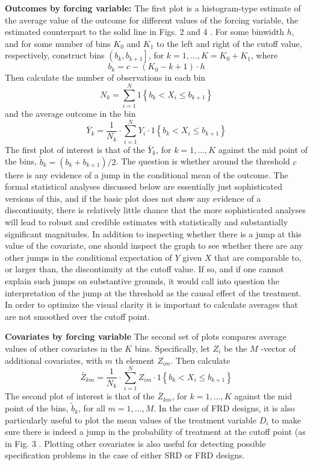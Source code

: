 \documentclass[11pt]{book}%
\begin{document}
\textbf{Outcomes by forcing variable:} 
The first plot is a histogram-type estimate of the average value of the outcome for different values of the forcing variable, the estimated counterpart to the solid line in Figs. 2 and 4 . For some binwidth $h$, and for some number of bins $K_{0}$ and $K_{1}$ to the left and right of the cutoff value, respectively, construct bins $\left(b_{k}, b_{k+1}\right]$, for $k=1, \ldots, K=K_{0}+K_{1}$, where
$$
b_{k}=c-\left(K_{0}-k+1\right) \cdot h
$$
Then calculate the number of observations in each bin
$$
N_{k}=\sum_{i=1}^{N} 1\left\{b_{k}<X_{i} \leqslant b_{k+1}\right\}
$$
and the average outcome in the bin
$$
\bar{Y}_{k}=\frac{1}{N_{k}} \cdot \sum_{i=1}^{N} Y_{i} \cdot 1\left\{b_{k}<X_{i} \leqslant b_{k+1}\right\}
$$
The first plot of interest is that of the $\bar{Y}_{k}$, for $k=1, \ldots, K$ against the mid point of the bins, $\tilde{b}_{k}=\left(b_{k}+b_{k+1}\right) / 2$. The question is whether around the threshold $c$ there is any evidence of a jump in the conditional mean of the outcome. The formal statistical analyses discussed below are essentially just sophisticated versions of this, and if the basic plot does not show any evidence of a discontinuity, there is relatively little chance that the more sophisticated analyses will lead to robust and credible estimates with statistically and substantially significant magnitudes. In addition to inspecting whether there is a jump at this value of the covariate, one should inspect the graph to see whether there are any other jumps in the conditional expectation of $Y$ given $X$ that are comparable to, or larger than, the discontinuity at the cutoff value. If so, and if one cannot explain such jumps on substantive grounds, it would call into question the interpretation of the jump at the threshold as the causal effect of the treatment. In order to optimize the visual clarity it is important to calculate averages that are not smoothed over the cutoff point.

\textbf{Covariates by forcing variable}
The second set of plots compares average values of other covariates in the $K$ bins. Specifically, let $Z_{i}$ be the $M$ -vector of additional covariates, with $m$ th element $Z_{i m} .$ Then calculate
$$
\bar{Z}_{k m}=\frac{1}{N_{k}} \cdot \sum_{i=1}^{N} Z_{i m} \cdot 1\left\{b_{k}<X_{i} \leqslant b_{k+1}\right\}
$$
The second plot of interest is that of the $\bar{Z}_{k m}$, for $k=1, \ldots, K$ against the mid point of the bins, $\tilde{b}_{k}$, for all $m=1, \ldots, M$. In the case of FRD designs, it is also particularly useful to plot the mean values of the treatment variable $D_{i}$ to make sure there is indeed a jump in the probability of treatment at the cutoff point (as in Fig. 3 . Plotting other covariates is also useful for detecting possible specification problems  in the case of either SRD or FRD designs.
\end{document}
